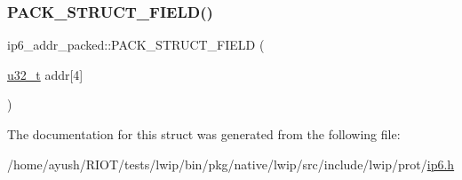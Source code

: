 \mbox{\label{structip6__addr__packed_a9d7cd2a55e5e416dec8a98f4cd495a55}} 
\subsubsection{\texorpdfstring{P\+A\+C\+K\+\_\+\+S\+T\+R\+U\+C\+T\+\_\+\+F\+I\+E\+L\+D()}{PACK\_STRUCT\_FIELD()}\hspace{0.1cm}{\footnotesize\ttfamily [2/2]}}
{\footnotesize\ttfamily ip6\+\_\+addr\+\_\+packed\+::\+P\+A\+C\+K\+\_\+\+S\+T\+R\+U\+C\+T\+\_\+\+F\+I\+E\+LD (\begin{DoxyParamCaption}\item[{\hyperlink{group__compiler__abstraction_ga4c14294869aceba3ef9d4c0c302d0f33}{u32\+\_\+t}}]{addr\mbox{[}4\mbox{]} }\end{DoxyParamCaption})}



The documentation for this struct was generated from the following file\+:\begin{DoxyCompactItemize}
\item 
/home/ayush/\+R\+I\+O\+T/tests/lwip/bin/pkg/native/lwip/src/include/lwip/prot/\hyperlink{native_2lwip_2src_2include_2lwip_2prot_2ip6_8h}{ip6.\+h}\end{DoxyCompactItemize}
